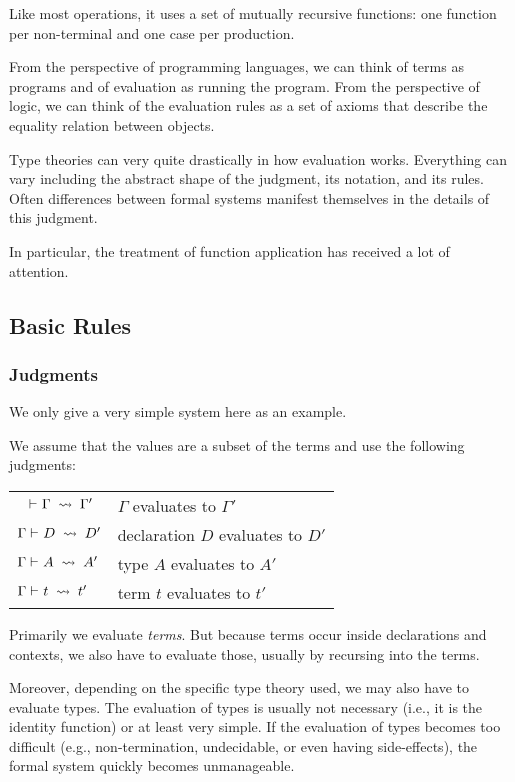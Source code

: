 Like most operations, it uses a set of mutually recursive functions: one function per non-terminal and one case per production.
\medskip

From the perspective of programming languages, we can think of terms as programs and of evaluation as running the program.
From the perspective of logic, we can think of the evaluation rules as a set of axioms that describe the equality relation between objects.
\medskip

Type theories can very quite drastically in how evaluation works.
Everything can vary including the abstract shape of the judgment, its notation, and its rules.
Often differences between formal systems manifest themselves in the details of this judgment.

In particular, the treatment of function application has received a lot of attention.

\subsection{Basic Rules}

\subsubsection{Judgments}

We only give a very simple system here as an example.

We assume that the values are a subset of the terms and use the following judgments:
\begin{center}
	\begin{tabular}{|l|l|}
	  \hline
		$\;\;\;\vdash^{}_{}\Gamma\;\rightsquigarrow\;\Gamma'$           & $\Gamma$ evaluates to $\Gamma'$\\
		$\Gamma\vdash^{}_{}D\;\rightsquigarrow\;D'$        & declaration $D$ evaluates to $D'$ \\
		$\Gamma\vdash^{}_{}A\;\rightsquigarrow\;A'$        & type $A$ evaluates to $A'$ \\
		$\Gamma\vdash^{}_{}t\;\rightsquigarrow\;t'$        & term $t$ evaluates to $t'$ \\
		\hline
	\end{tabular}
\end{center}
Primarily we evaluate \emph{terms}.
But because terms occur inside declarations and contexts, we also have to evaluate those, usually by recursing into the terms.

Moreover, depending on the specific type theory used, we may also have to evaluate types.
The evaluation of types is usually not necessary (i.e., it is the identity function) or at least very simple.
If the evaluation of types becomes too difficult (e.g., non-termination, undecidable, or even having side-effects), the formal system quickly becomes unmanageable.

